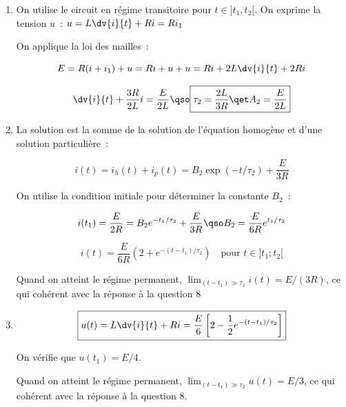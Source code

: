 \documentclass[a4paper, 10pt, garamond, oneside]{book}
\begin{document}
{\begin{enumerate}[resume]
\begin{minipage}[t]{.49\linewidth}
			      \[
				      u(t_2^-)=\frac{R/2}{R+R/2}E\qso
				      \boxed{u(t_2^-)=\frac{E}{3}}
			      \]

		      \end{minipage}
		      \hfill
		      \begin{minipage}[t]{.49\linewidth}
			      ~
			      \begin{center}
				      {transRL_corr2.pdf_tex}
			      \end{center}
		      \end{minipage}
		      En appliquant la loi d'Ohm, on trouve le courant $i$ ~: $\boxed{i(t_2^-)=\frac{E}{3R}}$
		\item
		      On utilise le circuit en régime transitoire pour $t\in]t_1,t_2[$. On exprime la tension $u$~: $u=L\dv{i}{t}+Ri=Ri_1$

		      On applique la loi des mailles~:

		      \[
			      E=R(i+i_1)+u=Ri+u+u=Ri+2L\dv{i}{t}+2Ri
		      \]

		      \[
			      \dv{i}{t}+\frac{3R}{2L}i=\frac{E}{2L}
			      \qso\boxed{\tau_2=\frac{2L}{3R}\qet A_2=\frac{E}{2L}}
		      \]
		\item
		      La solution est la somme de la solution de l'équation homogène et d'une solution particulière~:

		      \[
			      i(t)=i_h(t)+i_p(t)=B_2\exp(-t/\tau_2)+\frac{E}{3R}
		      \]



		      On utilise la condition initiale  pour déterminer la constante $B_2$~:

		      \[
			      i(t_1)=\frac{E}{2R}=B_2e^{-t_1/\tau_2}+\frac{E}{3R}
			      \qso B_2=\frac{E}{6R}e^{t_1/\tau_2}
		      \]


		      \[
			      \boxed{i(t)= \frac{E}{6R}\left (2+e^{-(t-t_1)/\tau_2}  \right )\quad\mbox{pour } t\in]t_1;t_2[}
		      \]

		      Quand on atteint le régime permanent, $\lim_{(t-t_1)\gg \tau_2}i(t)= E/(3R)$, ce qui cohérent avec la réponse à la question 8

		\item

		      \[
			      \boxed{u(t)=L\dv{i}{t}+Ri=\frac{E}{6}\left [2-\frac{1}{2}e^{-(t-t_1)/\tau_2}  \right ]}
		      \]

		      On vérifie que $u(t_1)=E/4$.

		      Quand on atteint le régime permanent, $\lim_{(t-t_1)\gg \tau_2}u(t)= E/3$, ce qui cohérent avec la réponse à la question 8.
	\end{enumerate}
}
\end{document}

